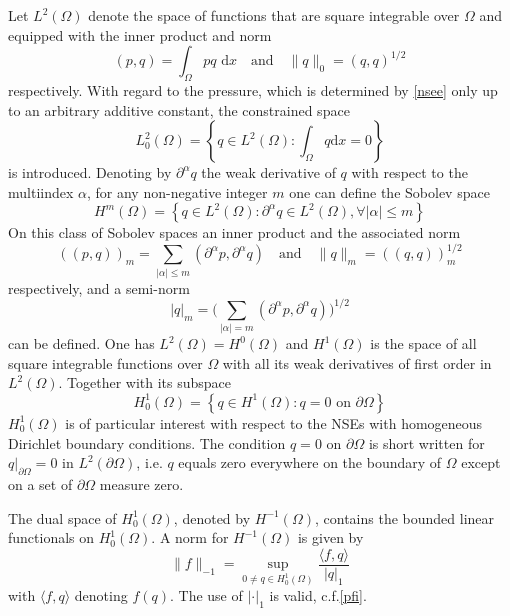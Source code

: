 \documentclass[a4paper,10pt,BCOR=15mm]{scrbook}
\providecommand{\abs}[1]{\lvert#1\rvert}
\providecommand{\norm}[1]{\lVert#1 \rVert}
\providecommand{\dupa}[2]{\langle #1,#2 \rangle}
\providecommand{\inva}[1]{\text{d} #1}
\providecommand{\andi}[0]{\quad \text{and} \quad}
\begin{document}
Let $L^2(\Omega)$ denote the space of functions that are square integrable over $\Omega$ and equipped with the inner product and norm
\begin{equation*}
 (p,q) = \int _ \Omega pq \text{ d} x \quad \text{and} \quad \norm{q}_0 = (q,q) ^ {1/2}
\end{equation*}
respectively. With regard to the pressure, which is determined by \eqref{nsee} only up to an arbitrary additive constant, the constrained space
\begin{equation*}
 L_0^2(\Omega) = \left \{ q \in L^2(\Omega) : \int_\Omega q \inva{x} = 0 \right \}
\end{equation*}
is introduced. Denoting by $\partial ^ \alpha q$ the weak derivative of $q$ with respect to the multiindex $\alpha$, for any non-negative integer $m$ one can define the Sobolev space
\begin{equation*}
 H^{m}(\Omega) = \left \{ q \in L^2(\Omega) : \partial ^ \alpha q \in L^2(\Omega), \forall \abs{\alpha} \leq m \right \}  
\end{equation*}
On this class of Sobolev spaces an inner product and the associated norm
\begin{equation*}
 ((p,q))_m = \sum _ {\abs{\alpha} \leq m } (\partial ^ \alpha p, \partial ^ \alpha q)  \andi{} \norm{q}_m = ((q,q))_m ^ {1/2}
\end{equation*}
respectively, and a semi-norm
\begin{equation*}
 \abs{q}_m =\bigl ( \sum _ {\abs{\alpha} = m } (\partial ^ \alpha p, \partial ^ \alpha q)  \bigr ) ^ {1/2}
\end{equation*}
can be defined. One has $L^2(\Omega) = H^0(\Omega)$ and $H^1(\Omega)$ is the space of all square integrable functions over $\Omega$ with all its weak derivatives of first order in $L^2(\Omega)$.  Together with its subspace 
\begin{equation*}
 H^1_0(\Omega) = \left \{ q \in H^1(\Omega) : q =0 \text{ on } \partial \Omega \right \}  
\end{equation*}
$H_0^1(\Omega)$ is of particular interest with respect to the NSEs with homogeneous Dirichlet boundary conditions. The condition $q = 0$ on $\partial \Omega$ is short written for $q\vert _{\partial \Omega} = 0$ in $L^2(\partial \Omega)$, i.e. $q$ equals zero everywhere on the boundary of $\Omega$ except on a set of $\partial \Omega$ measure zero. 

The dual space of $H_0^1(\Omega)$, denoted by $H^{-1}(\Omega)$, contains the bounded linear functionals on $H_0^1(\Omega)$. A norm for $H^{-1}(\Omega)$ is given by
\begin{equation*}
 \norm{f}_{-1} = \sup _ {0 \neq q \in H_0 ^1(\Omega) }\frac{\dupa{f}{q} }{\abs{q}_1}
\end{equation*}
with $\dupa{f}{q}$ denoting $f(q)$. The use of $\abs{\cdot}_1$ is valid, c.f.\eqref{pfi}.
\end{document}
